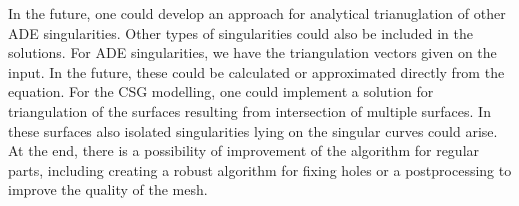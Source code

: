 In the future, one could develop an approach for analytical trianuglation of 
other ADE singularities. Other types of singularities could also be included in 
the solutions. For ADE singularities, we have the triangulation vectors given on 
the input. In the future, these could be calculated or approximated directly from 
the equation. For the CSG modelling, one could implement a solution for triangulation
of the surfaces resulting from intersection of multiple surfaces. In these surfaces
also isolated singularities lying on the singular curves could arise. At the end,
there is a possibility of improvement of the algorithm for regular parts, including
creating a robust algorithm for fixing holes or a postprocessing to improve the
quality of the mesh.

